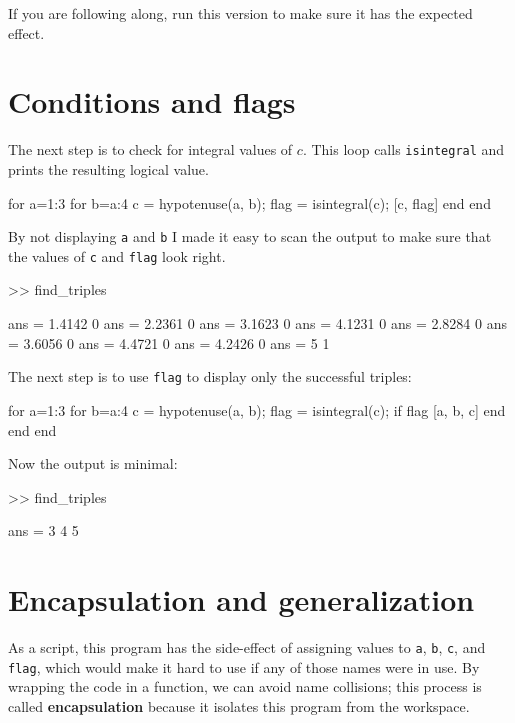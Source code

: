 \documentclass[
]{book}
\numberwithin{Answer}{chapter}
\numberwithin{Exercise}{chapter}
\begin{document}
If you are following along, run this version to make sure it has
the expected effect.


\section{Conditions and flags}

The next step is to check for integral values of $c$.  This
loop calls {\tt isintegral} and prints the resulting logical
value.

\begin{code}
for a=1:3
    for b=a:4
        c = hypotenuse(a, b);
        flag = isintegral(c);
        [c, flag]
    end
end
\end{code}

By not displaying {\tt a} and {\tt b} I made it easy to scan the
output to make sure that the values of {\tt c} and {\tt flag}
look right.

\begin{code}
>> find_triples

ans = 1.4142         0
ans = 2.2361         0
ans = 3.1623         0
ans = 4.1231         0
ans = 2.8284         0
ans = 3.6056         0
ans = 4.4721         0
ans = 4.2426         0
ans = 5              1
\end{code}

The next step is to use {\tt flag} to display only the successful
triples:

\begin{code}
for a=1:3
    for b=a:4
        c = hypotenuse(a, b);
        flag = isintegral(c);
        if flag
            [a, b, c]
        end
    end
end
\end{code}

Now the output is minimal:

\begin{code}
>> find_triples

ans = 3     4     5
\end{code}




\section{Encapsulation and generalization}

As a script, this program has the side-effect of assigning values to
{\tt a}, {\tt b}, {\tt c}, and {\tt flag}, which would make it hard to
use if any of those names were in use.  
By wrapping the code in a function, we can avoid name collisions; this process is called {\bf encapsulation} because it isolates this program from the workspace.
\end{document}
